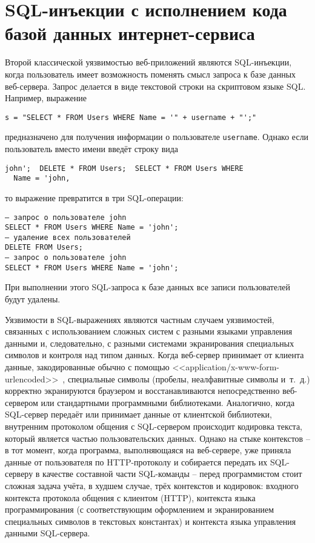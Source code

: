 \section[SQL-инъекции с исполнением кода веб-сервером]{SQL-инъекции с исполнением кода \protect\\ базой данных интернет-сервиса}

Второй классической уязвимостью веб-приложений являются SQL-инъекции, когда пользователь имеет возможность поменять смысл запроса к базе данных веб-сервера. Запрос делается в виде текстовой строки на скриптовом языке SQL. Например, выражение
\begin{verbatim}
s = "SELECT * FROM Users WHERE Name = '" + username + "';"
\end{verbatim}
предназначено для получения информации о пользователе \texttt{username}. Однако если пользователь вместо имени введёт строку вида
\begin{center} \begin{verbatim}
john';  DELETE * FROM Users;  SELECT * FROM Users WHERE
  Name = 'john,
\end{verbatim} \end{center}
то выражение превратится в три SQL-операции:
\begin{verbatim}
– запрос о пользователе john
SELECT * FROM Users WHERE Name = 'john';
– удаление всех пользователей
DELETE FROM Users;
– запрос о пользователе john
SELECT * FROM Users WHERE Name = 'john';
\end{verbatim}
При выполнении этого SQL-запроса к базе данных все записи пользователей будут удалены.

Уязвимости в SQL-выражениях являются частным случаем уязвимостей, связанных с использованием сложных систем с разными языками управления данными и, следовательно, с разными системами экранирования специальных символов и контроля над типом данных. Когда веб-сервер принимает от клиента данные, закодированные обычно с помощью <<application/x-www-form-urlencoded>>~\cite{html4:1999}, специальные символы (пробелы, неалфавитные символы и~т.~д.) корректно экранируются браузером и восстанавливаются непосредственно веб-сервером или стандартными программными библиотеками. Аналогично, когда SQL-сервер передаёт или принимает данные от клиентской библиотеки, внутренним протоколом общения с SQL-сервером происходит кодировка текста, который является частью пользовательских данных. Однако на стыке контекстов -- в тот момент, когда программа, выполняющаяся на веб-сервере, уже приняла данные от пользователя по HTTP-протоколу и собирается передать их SQL-серверу в качестве составной части SQL-команды -- перед программистом стоит сложная задача учёта, в худшем случае, трёх контекстов и кодировок: входного контекста протокола общения с клиентом (HTTP), контекста языка программирования (с соответствующим оформлением и экранированием специальных символов в текстовых константах) и контекста языка управления данными SQL-сервера.

